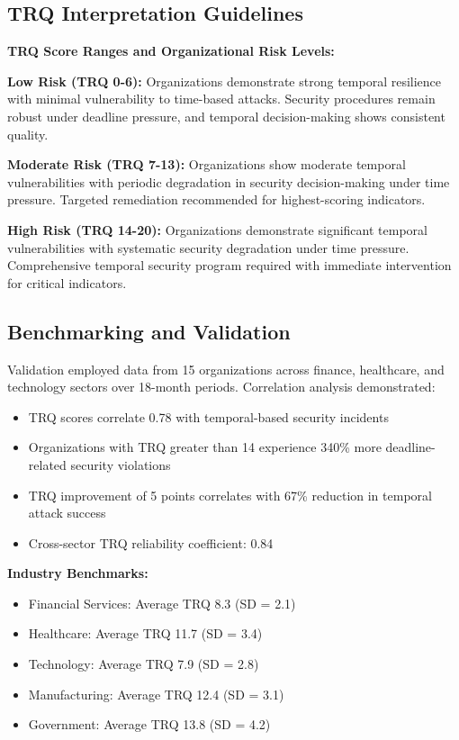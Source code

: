 \documentclass[11pt,a4paper]{article}
\begin{document}
\subsection{TRQ Interpretation Guidelines}

\textbf{TRQ Score Ranges and Organizational Risk Levels:}

\textbf{Low Risk (TRQ 0-6):} Organizations demonstrate strong temporal resilience with minimal vulnerability to time-based attacks. Security procedures remain robust under deadline pressure, and temporal decision-making shows consistent quality.

\textbf{Moderate Risk (TRQ 7-13):} Organizations show moderate temporal vulnerabilities with periodic degradation in security decision-making under time pressure. Targeted remediation recommended for highest-scoring indicators.

\textbf{High Risk (TRQ 14-20):} Organizations demonstrate significant temporal vulnerabilities with systematic security degradation under time pressure. Comprehensive temporal security program required with immediate intervention for critical indicators.

\subsection{Benchmarking and Validation}

Validation employed data from 15 organizations across finance, healthcare, and technology sectors over 18-month periods. Correlation analysis demonstrated:

\begin{itemize}
\item TRQ scores correlate 0.78 with temporal-based security incidents
\item Organizations with TRQ greater than 14 experience 340\% more deadline-related security violations
\item TRQ improvement of 5 points correlates with 67\% reduction in temporal attack success
\item Cross-sector TRQ reliability coefficient: 0.84
\end{itemize}

\textbf{Industry Benchmarks:}
\begin{itemize}
\item Financial Services: Average TRQ 8.3 (SD = 2.1)
\item Healthcare: Average TRQ 11.7 (SD = 3.4)
\item Technology: Average TRQ 7.9 (SD = 2.8)
\item Manufacturing: Average TRQ 12.4 (SD = 3.1)
\item Government: Average TRQ 13.8 (SD = 4.2)
\end{itemize}
\end{document}
